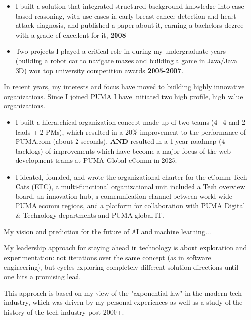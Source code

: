 \begin{itemize}
\item I built a solution that integrated structured background knowledge into case-based reasoning, with use-cases in early breast cancer detection and heart attack diagnosis, and published a paper about it, earning a bachelors degree with a grade of excellent for it, \textbf{2008} 

\item Two projects I played a critical role in during my undergraduate years (building a robot car to navigate mazes and building a game in Java/Java 3D) won top university competition awards \textbf{2005-2007}.

\end{itemize}

In recent years, my interests and focus have moved to building highly innovative organizations. Since I joined PUMA I have initiated two high profile, high value organizations. 

\begin{itemize}

\item I built a hierarchical organization concept made up of two teams (4+4 and 2 leads + 2 PMs), which resulted in a 20\% improvement to the performance of PUMA.com (about 2 seconds), \textbf{AND} resulted in a 1 year roadmap (4 backlogs) of improvements which have become a major focus of the web development teams at PUMA Global eComm in 2025.

\item I ideated, founded, and wrote the organizational charter for the eComm Tech Cats (ETC), a multi-functional organizational unit included a Tech overview board, an innovation hub, a communication channel between world wide PUMA ecomm regions, and a platform for collaboration with PUMA Digital \& Technology departments and PUMA global IT.


\end{itemize}


My vision and prediction for the future of AI and machine learning...

 
My leadership approach for staying ahead in technology is about exploration and experimentation: not iterations over the same concept (as in software engineering), but cycles exploring completely different solution directions until one hits a promising lead.

This approach is based on my view of the "exponential law" in the modern tech industry, which was driven by my personal experiences as well as a study of the history of the tech industry post-2000+.


